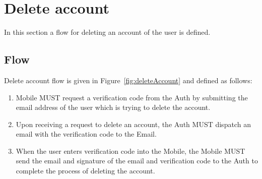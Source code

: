\section{Delete account}
In this section a flow for deleting an account of the user is defined. 

    \subsection{Flow}
    Delete account flow is given in Figure~\ref{fig:deleteAccount} and defined as follows:
        \begin{enumerate}
            \item Mobile MUST request a verification code from the Auth by submitting the email address of the user
                  which is trying to delete the account.
            \item Upon receiving a request to delete an account, the Auth MUST dispatch an email with the verification
                  code to the Email.
            \item When the user enters verification code into the Mobile, the Mobile MUST send the email and signature 
                  of the email and verification code to the Auth to complete the process of deleting the account.
        \end{enumerate}
        

